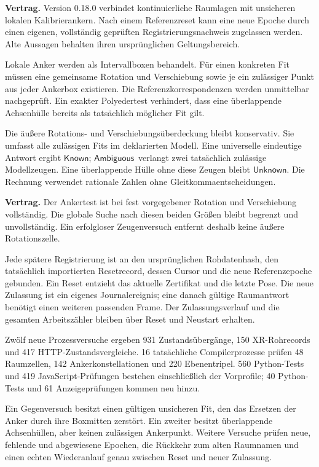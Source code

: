 \documentclass[11pt,a4paper]{article}
\newcommand{\Known}{\ensuremath{\mathsf{Known}}}
\newcommand{\Unknown}{\ensuremath{\mathsf{Unknown}}}
\newcommand{\Ambiguous}{\ensuremath{\mathsf{Ambiguous}}}
\newcommand{\contract}[1]{\vspace{3pt}\noindent\colorbox{pale}{\parbox{\dimexpr\linewidth-2\fboxsep}{\textbf{Vertrag.} #1}}\vspace{5pt}}
\begin{document}
\contract{Version 0.18.0 verbindet kontinuierliche Raumlagen mit
unsicheren lokalen Kalibrierankern. Nach einem Referenzreset kann
eine neue Epoche durch einen eigenen, vollständig geprüften
Registrierungsnachweis zugelassen werden. Alte Aussagen behalten
ihren ursprünglichen Geltungsbereich.}

Lokale Anker werden als Intervallboxen behandelt. Für einen
konkreten Fit müssen eine gemeinsame Rotation und Verschiebung
sowie je ein zulässiger Punkt aus jeder Ankerbox existieren.
Die Referenzkorrespondenzen werden unmittelbar nachgeprüft.
Ein exakter Polyedertest verhindert, dass eine überlappende
Achsenhülle bereits als tatsächlich möglicher Fit gilt.

Die äußere Rotations- und Verschiebungsüberdeckung bleibt
konservativ. Sie umfasst alle zulässigen Fits im deklarierten
Modell. Eine universelle eindeutige Antwort ergibt \Known;
\Ambiguous\ verlangt zwei tatsächlich zulässige Modellzeugen.
Eine überlappende Hülle ohne diese Zeugen bleibt \Unknown.
Die Rechnung verwendet rationale Zahlen ohne Gleitkommaentscheidungen.

\contract{Der Ankertest ist bei fest vorgegebener Rotation und
Verschiebung vollständig. Die globale Suche nach diesen beiden
Größen bleibt begrenzt und unvollständig. Ein erfolgloser
Zeugenversuch entfernt deshalb keine äußere Rotationszelle.}

Jede spätere Registrierung ist an den ursprünglichen Rohdatenhash,
den tatsächlich importierten Resetrecord, dessen Cursor und die
neue Referenzepoche gebunden. Ein Reset entzieht das aktuelle
Zertifikat und die letzte Pose. Die neue Zulassung ist ein eigenes
Journalereignis; eine danach gültige Raumantwort benötigt einen
weiteren passenden Frame. Der Zulassungsverlauf und die gesamten
Arbeitszähler bleiben über Reset und Neustart erhalten.

Zwölf neue Prozessversuche ergeben 931 Zustandsübergänge,
150 XR-Rohrecords und 417 HTTP-Zustandsvergleiche.
16 tatsächliche Compilerprozesse prüfen 48 Raumzellen,
142 Ankerkonstellationen und 220 Ebenentripel. 560 Python-Tests
und 419 JavaScript-Prüfungen bestehen einschließlich der Vorprofile;
40 Python-Tests und 61 Anzeigeprüfungen kommen neu hinzu.

Ein Gegenversuch besitzt einen gültigen unsicheren Fit, den das
Ersetzen der Anker durch ihre Boxmitten zerstört. Ein zweiter
besitzt überlappende Achsenhüllen, aber keinen zulässigen Ankerpunkt.
Weitere Versuche prüfen neue, fehlende und abgewiesene Epochen,
die Rückkehr zum alten Raumnamen und einen echten Wiederanlauf
genau zwischen Reset und neuer Zulassung.
\end{document}
